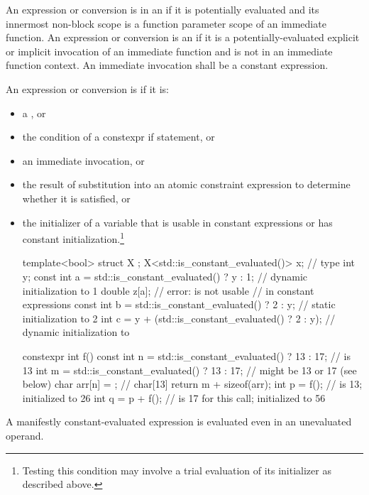 \pnum
An expression or conversion is in an 
if it is potentially evaluated and
its innermost non-block scope is
a function parameter scope of an immediate function.
An expression or conversion is an 
if it is a potentially-evaluated explicit or implicit invocation of
an immediate function and
is not in an immediate function context.
An immediate invocation shall be a constant expression.

\pnum
An expression or conversion is 
if it is:
\begin{itemize}
\item a , or
\item the condition of a constexpr if statement, or
\item an immediate invocation, or
\item the result of substitution into an atomic constraint expression
to determine whether it is satisfied, or
\item the initializer of a variable
that is usable in constant expressions or
has constant initialization.\footnote{Testing this condition
may involve a trial evaluation of its initializer as described above.}
\begin{example}
\begin{codeblock}
template<bool> struct X {};
X<std::is_constant_evaluated()> x;                      // type 
int y;
const int a = std::is_constant_evaluated() ? y : 1;     // dynamic initialization to 1
double z[a];                                            // error:  is not usable
                                                        // in constant expressions
const int b = std::is_constant_evaluated() ? 2 : y;     // static initialization to 2
int c = y + (std::is_constant_evaluated() ? 2 : y);     // dynamic initialization to 

constexpr int f() {
  const int n = std::is_constant_evaluated() ? 13 : 17; //  is 13
  int m = std::is_constant_evaluated() ? 13 : 17;       //  might be 13 or 17 (see below)
  char arr[n] = {}; // char[13]
  return m + sizeof(arr);
}
int p = f();                                            //  is 13; initialized to 26
int q = p + f();                                        //  is 17 for this call; initialized to 56
\end{codeblock}
\end{example}
\end{itemize}
\begin{note}
A manifestly constant-evaluated expression
is evaluated even in an unevaluated operand.
\end{note}


